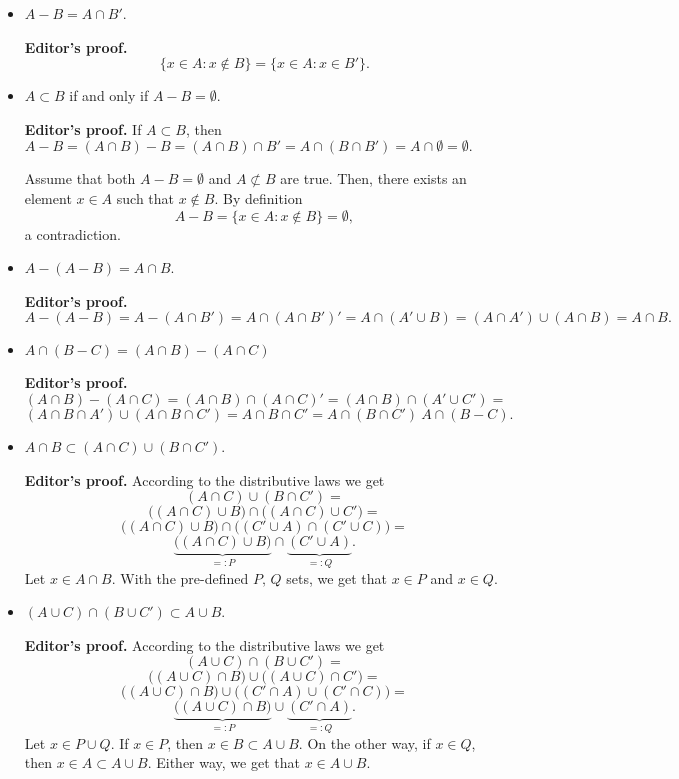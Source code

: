 \begin{itemize}
	\item $A - B = A \cap B'$.
	
	\textbf{Editor's proof.}
	\[
		\{ x \in A : x \not \in B \} = \{ x \in A : x \in B'\}.
	\]
	\item $A \subset B$ if and only if $A - B = \emptyset$.
	
	\textbf{Editor's proof.} If $A \subset B$, then $A - B = (A \cap B) - B = (A \cap B) \cap B' = A \cap (B \cap B') = A \cap \emptyset = \emptyset.$
	
	Assume that both $A - B = \emptyset$ and $A \not \subset B$ are true. Then, there exists an element $x \in A$ such that $x \not \in B$. By definition
	\[
		A - B = \{ x \in A : x \not \in B\} = \emptyset,
	\]
	a contradiction.
	\item $A - (A - B) = A \cap B$. 
	
	\textbf{Editor's proof.}
	\[
		A - (A - B) = A - (A \cap B') = A \cap (A \cap B')' = A \cap (A' \cup B) = (A \cap A') \cup (A \cap B) = A \cap B.
	\]
	\item $A \cap (B - C) = (A \cap B) - (A \cap C)$
	
	\textbf{Editor's proof.}
	\[
		(A \cap B) - (A \cap C) = (A \cap B) \cap (A \cap C)' = (A \cap B) \cap (A' \cup C') =
	\]
	\[
		(A \cap B \cap A') \cup (A \cap B \cap C') = A \cap B \cap C' = A \cap (B \cap C') \ A \cap (B - C).
	\]
	\item $A \cap B \subset (A \cap C) \cup (B \cap C')$.
	
	\textbf{Editor's proof.} According to the distributive laws we get
	\[
		(A \cap C) \cup (B \cap C') =
	\]
	\[
		\big( (A \cap C) \cup B \big) \cap \big( (A \cap C) \cup C' \big) =
	\]
	\[
		\big( (A \cap C) \cup B \big) \cap \big( (C' \cup A) \cap (C' \cup C)\big) =	
	\]
	\[
		\underbrace{\big( (A \cap C) \cup B \big)}_{ =: P}  \cap \underbrace{(C' \cup A)}_{ =: Q}.
	\]
	Let $x \in A \cap B$. With the pre-defined $P, \, Q$ sets, we get that $x \in P$ and $x \in Q$.
	
	\item $(A \cup C) \cap (B \cup C') \subset A \cup B$.
	
	\textbf{Editor's proof.} According to the distributive laws we get
	\[
		(A \cup C) \cap (B \cup C') =
	\]
	\[
		\big( (A \cup C) \cap B \big) \cup \big( (A \cup C) \cap C' \big) =
	\]
	\[
		\big( (A \cup C) \cap B \big) \cup \big( (C' \cap A) \cup (C' \cap C) \big) =
	\]
	\[
		\underbrace{\big( (A \cup C) \cap B \big)}_{ =: P} \cup \underbrace{(C' \cap A)}_{ =: Q}.
	\]
	Let $x \in P \cup Q$. If $x \in P$, then $x \in B \subset A \cup B$. On the other way, if $x \in Q$, then $x \in A \subset A \cup B$. Either way, we get that $x \in A \cup B$.
	
	
\end{itemize}


